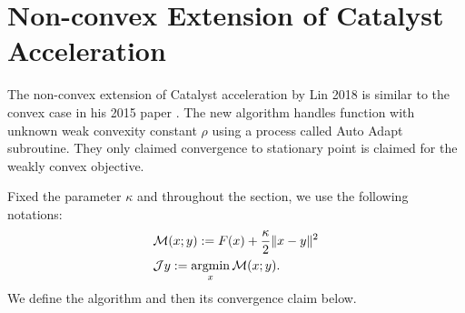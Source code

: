\documentclass[12pt]{article}
\begin{document}
    

\section{Non-convex Extension of Catalyst Acceleration}
    The non-convex extension of Catalyst acceleration by Lin 2018 \cite{lin_catalyst_2018} is similar to the convex case in his 2015 paper \cite{lin_universal_2015}. 
    The new algorithm handles function with unknown weak convexity constant $\rho$ using a process called Auto Adapt subroutine. 
    They only claimed convergence to stationary point is claimed for the weakly convex objective. 
    \par 
    Fixed the parameter $\kappa$ and throughout the section, we use the following notations: 
    \begin{align*}
       & \mathcal M (x; y) := F(x) + \frac{\kappa}{2}\Vert x - y\Vert^2 
       \\
       & \mathcal J y := \mathop{\rm argmin}\limits_x \mathcal M (x; y). 
    \end{align*}
    We define the algorithm and then its convergence claim below. 
\end{document}
